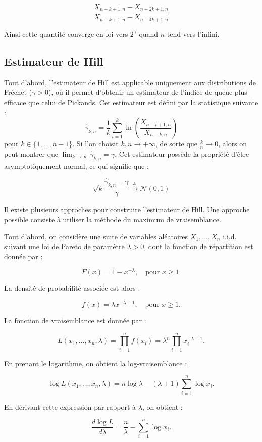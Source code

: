 \documentclass{article}
\begin{document}
\[
\frac{X_{n-k+1,n} - X_{n-2k+1,n}}{X_{n-k+1,n} - X_{n-4k+1,n}}
\]

Ainsi cette quantité converge en loi vers $2^{\gamma}$ quand $n$ tend vers l’infini.

\subsection{Estimateur de Hill}

Tout d'abord, l'estimateur de Hill est applicable uniquement aux distributions de Fréchet (\(\gamma > 0\)), où il permet d'obtenir un estimateur de l'indice de queue plus efficace que celui de Pickands. Cet estimateur est défini par la statistique suivante :
\[
\hat{\gamma}_{k,n} = \frac{1}{k} \sum_{i=1}^{k} \ln(\frac{X_{n-i+1,n}}{X_{n-k,n}})
\]
pour \( k \in \{1, \dots, n-1\} \).
Si l'on choisit \( k, n \to +\infty \), de sorte que \(\frac{k}{n} \to 0\), alors on peut montrer que \(\lim_{k \to \infty} \hat{\gamma}_{k,n} = \gamma\). Cet estimateur possède la propriété d'être asymptotiquement normal, ce qui signifie que :

\[
\sqrt{k} \frac{\hat{\gamma}_{k,n} - \gamma}{\gamma} \xrightarrow{\mathcal{L}} \mathcal{N}(0,1)
\]

Il existe plusieurs approches pour construire l'estimateur de Hill. Une approche possible consiste à utiliser la méthode du maximum de vraisemblance. 

Tout d'abord, on considère une suite de variables aléatoires \( X_1, \dots, X_n \) i.i.d. suivant une loi de Pareto de paramètre \( \lambda > 0 \), dont la fonction de répartition est donnée par :  

\[
F(x) = 1 - x^{-\lambda}, \quad \text{pour } x \geq 1.
\]

La densité de probabilité associée est alors :

\[
f(x) = \lambda x^{-\lambda - 1}, \quad \text{pour } x \geq 1.
\]

La fonction de vraisemblance est donnée par :

\[
L(x_1, \dots, x_n, \lambda) = \prod_{i=1}^{n} f(x_i) = \lambda^{n} \prod_{i=1}^{n} x_i^{-\lambda - 1}.
\]

En prenant le logarithme, on obtient la log-vraisemblance :

\[
\log L(x_1, \dots, x_n, \lambda) = n \log \lambda - (\lambda + 1) \sum_{i=1}^{n} \log x_i.
\]

En dérivant cette expression par rapport à \( \lambda \), on obtient :

\[
\frac{d \log L}{d \lambda} = \frac{n}{\lambda} - \sum_{i=1}^{n} \log x_i.
\]
\end{document}
